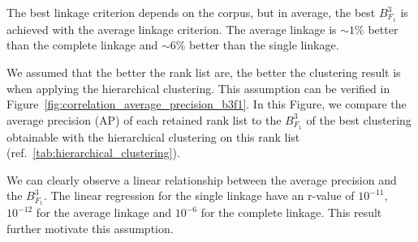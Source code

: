 The best linkage criterion depends on the corpus, but in average, the best $B^3_{F_1}$ is achieved with the average linkage criterion.
The average linkage is $\sim 1\%$ better than the complete linkage and $\sim 6\%$ better than the single linkage.

We assumed that the better the rank list are, the better the clustering result is when applying the hierarchical clustering.
This assumption can be verified in Figure~\ref{fig:correlation_average_precision_b3f1}.
In this Figure, we compare the average precision (AP) of each retained rank list to the $B^3_{F_1}$ of the best clustering obtainable with the hierarchical clustering on this rank list (ref.~\ref{tab:hierarchical_clustering}).

We can clearly observe a linear relationship between the average precision and the $B^3_{F_1}$.
The linear regression for the single linkage have an r-value of $10^{-11}$, $10^{-12}$ for the average linkage and $10^{-6}$ for the complete linkage.
This result further motivate this assumption.

